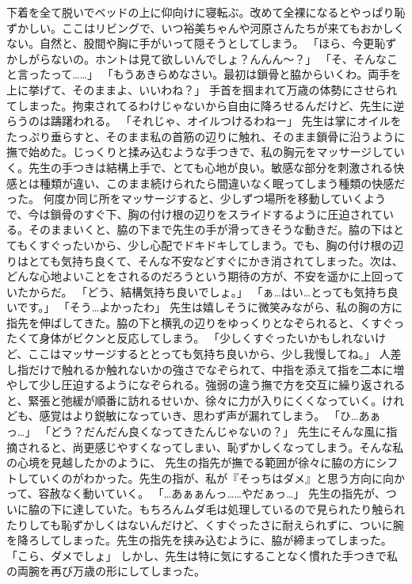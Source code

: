 下着を全て脱いでベッドの上に仰向けに寝転ぶ。改めて全裸になるとやっぱり恥ずかしい。ここはリビングで、いつ裕美ちゃんや河原さんたちが来てもおかしくない。自然と、股間や胸に手がいって隠そうとしてしまう。
「ほら、今更恥ずかしがらないの。ホントは見て欲しいんでしょ？んんん～？」
「そ、そんなこと言ったって……」
「もうあきらめなさい。最初は鎖骨と脇からいくわ。両手を上に挙げて、そのままよ、いいわね？」
手首を掴まれて万歳の体勢にさせられてしまった。拘束されてるわけじゃないから自由に降ろせるんだけど、先生に逆らうのは躊躇われる。
「それじゃ、オイルつけるわねー」
先生は掌にオイルをたっぷり垂らすと、そのまま私の首筋の辺りに触れ、そのまま鎖骨に沿うように撫で始めた。じっくりと揉み込むような手つきで、私の胸元をマッサージしていく。先生の手つきは結構上手で、とても心地が良い。敏感な部分を刺激される快感とは種類が違い、このまま続けられたら間違いなく眠ってしまう種類の快感だった。
何度か同じ所をマッサージすると、少しずつ場所を移動していくようで、今は鎖骨のすぐ下、胸の付け根の辺りをスライドするように圧迫されている。そのままいくと、脇の下まで先生の手が滑ってきそうな動きだ。脇の下はとてもくすぐったいから、少し心配でドキドキしてしまう。でも、胸の付け根の辺りはとても気持ち良くて、そんな不安などすぐにかき消されてしまった。次は、どんな心地よいことをされるのだろうという期待の方が、不安を遥かに上回っていたからだ。
「どう、結構気持ち良いでしょ。」
「ぁ…はい…とっても気持ち良いです。」
「そう…よかったわ」
先生は嬉しそうに微笑みながら、私の胸の方に指先を伸ばしてきた。脇の下と横乳の辺りをゆっくりとなぞられると、くすぐったくて身体がビクンと反応してしまう。
「少しくすぐったいかもしれないけど、ここはマッサージするととっても気持ち良いから、少し我慢してね。」
人差し指だけで触れるか触れないかの強さでなぞられて、中指を添えて指を二本に増やして少し圧迫するようになぞられる。強弱の違う撫で方を交互に繰り返されると、緊張と弛緩が順番に訪れるせいか、徐々に力が入りにくくなっていく。けれども、感覚はより鋭敏になっていき、思わず声が漏れてしまう。
「ひ…あぁっ…」
「どう？だんだん良くなってきたんじゃないの？」
先生にそんな風に指摘されると、尚更感じやすくなってしまい、恥ずかしくなってしまう。そんな私の心境を見越したかのように、
先生の指先が撫でる範囲が徐々に脇の方にシフトしていくのがわかった。先生の指が、私が『そっちはダメ』と思う方向に向かって、容赦なく動いていく。
「…あぁぁんっ……やだぁっ…」
先生の指先が、ついに脇の下に達していた。もちろんムダ毛は処理しているので見られたり触られたりしても恥ずかしくはないんだけど、くすぐったさに耐えられずに、ついに腕を降ろしてしまった。先生の指先を挟み込むように、脇が締まってしまった。
「こら、ダメでしょ」
しかし、先生は特に気にすることなく慣れた手つきで私の両腕を再び万歳の形にしてしまった。
